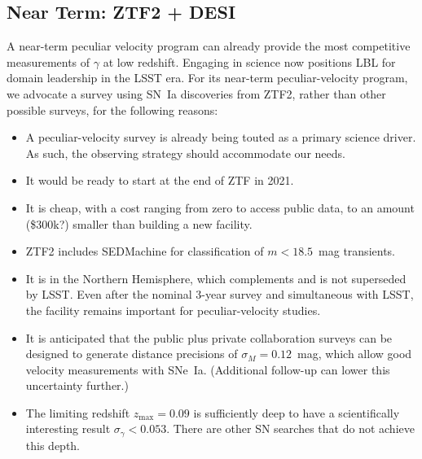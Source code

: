 \subsection{Near Term: ZTF2 + DESI}
A near-term peculiar velocity program can already provide the most competitive measurements of $\gamma$ at low redshift.  Engaging in science
now positions LBL for domain leadership in the LSST era.  For its near-term peculiar-velocity program, we advocate a survey using SN~Ia discoveries from ZTF2,
rather than other possible surveys, for the following reasons:
\begin{itemize}
\item A peculiar-velocity survey is already being touted as a primary science driver. As such,
the observing strategy should accommodate our needs.
\item It would be ready to start at the end of ZTF in 2021.
\item It is cheap, with a cost ranging from zero to access public data, to an amount (\$300k?) smaller
than building a new facility.
\item ZTF2 includes SEDMachine for classification of $m<18.5$~mag  transients.
\item It is in the Northern Hemisphere, which complements and is not superseded by LSST. 
Even after the nominal 3-year survey and simultaneous with LSST, the facility remains important for peculiar-velocity studies.
\item It is anticipated that the public plus private collaboration surveys can be designed to generate distance
precisions of $\sigma_M =0.12$~mag, which allow good velocity measurements with SNe~Ia.  (Additional follow-up can lower this uncertainty further.)
\item The limiting redshift $z_{\text{max}} =0.09$ is sufficiently deep  to have a scientifically interesting result $\sigma_\gamma < 0.053$.
There are other SN searches that do not achieve this depth.
\end{itemize}

